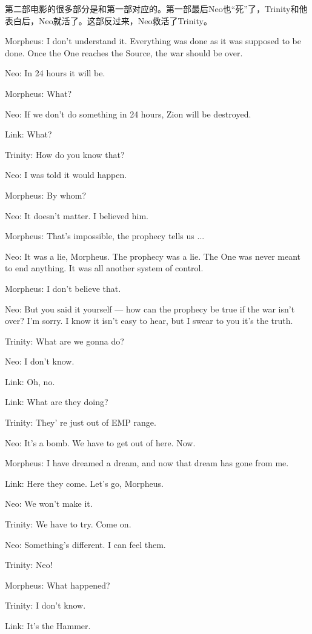 \documentclass{ctexart}
\newenvironment{myquote}{\color{green} \setlength{\leftskip}{6em} \setlength{\rightskip}{4em} \setlength{\parindent}{-2em}}{\par}
\begin{document}
第二部电影的很多部分是和第一部对应的。第一部最后Neo也“死”了，Trinity和他表白后，Neo就活了。这部反过来，Neo救活了Trinity。

\begin{myquote}
Morpheus: I don't understand it. Everything was done as it was supposed to be done. Once the One reaches the Source, the war should be over.

Neo: In 24 hours it will be.

Morpheus: What?

Neo: If we don't do something in 24 hours, Zion will be destroyed.

Link: What?

Trinity: How do you know that?

Neo: I was told it would happen.

Morpheus: By whom?

Neo: It doesn't matter. I believed him.

Morpheus: That's impossible, the prophecy tells us ...

Neo: It was a lie, Morpheus. The prophecy was a lie. The One was never meant to end anything. It was all another system of control.

Morpheus: I don't believe that.

Neo: But you said it yourself --- how can the prophecy be true if the war isn't over? I'm sorry. I know it isn't easy to hear, but I swear to you it's the truth.

Trinity: What are we gonna do?

Neo: I don't know.

Link: Oh, no.

Link: What are they doing?

Trinity: They' re just out of EMP range.

Neo: It's a bomb. We have to get out of here. Now.

Morpheus: I have dreamed a dream, and now that dream has gone from me.

Link: Here they come. Let's go, Morpheus.

Neo: We won't make it.

Trinity: We have to try. Come on.

Neo: Something's different. I can feel them.

Trinity: Neo!

Morpheus: What happened?

Trinity: I don't know.

Link: It's the Hammer.


\end{myquote}
\end{document}
